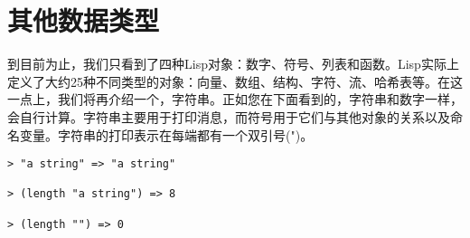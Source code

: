\section{其他数据类型}
到目前为止，我们只看到了四种Lisp对象：数字、符号、列表和函数。Lisp实际上定义了大约25种不同类型的对象：向量、数组、结构、字符、流、哈希表等。在这一点上，我们将再介绍一个，字符串。正如您在下面看到的，字符串和数字一样，会自行计算。字符串主要用于打印消息，而符号用于它们与其他对象的关系以及命名变量。字符串的打印表示在每端都有一个双引号(")。
\begin{lstlisting}[frame=shadowbox]
> "a string" => "a string"

> (length "a string") => 8

> (length "") => 0
\end{lstlisting}
